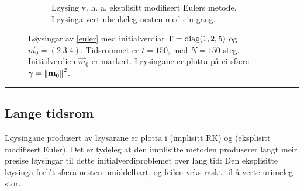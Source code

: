 \documentclass[12pt]{article}
\begin{document}
\begin{minipage}[!b]{\textwidth}
\begin{figure}[H]
\begin{subfigure}{.4\textwidth}
        \caption{
            Løysing v. h. a. eksplisitt modifisert Eulers metode.
            Løysinga vert ubrukeleg nesten med ein gang.
        }
        \label{fig:euler}
        \end{subfigure}
        \caption {
            Løysingar av \eqref{euler} med initialverdiar
            $\mathbf{\mathrm{T}} = \mathrm{diag} (1, 2, 5)$ og $\vec m_0 = (2 \; 3 \; 4)$.
            Tidsrommet er $t = 150$, med $N = 150$ steg.
            Initialverdien $\vec m_0$ er markert.
            Løysingane er plotta på ei sfære $\gamma = \left\lVert{\mathbf{m}}_0\right\rVert_{}^2$.
        }
        \label{fig:loysingar}
    \end{figure}
    \hrule
\end{minipage}
\begin{multicols*}{2}

    \subsection{Lange tidsrom}

    \noindent Løysingane produsert av løysarane er plotta i
     (implisitt RK) og  (eksplisitt modifisert Euler).
    Det er tydeleg at den implisitte metoden produserer
    langt meir presise løysingar til dette initialverdiproblemet
    over lang tid:
    Den eksplisitte løysinga forl\'et sfæra nesten umiddelbart,
    og feilen veks raskt til å verte urimeleg stor.



\printbibliography

\end{multicols*}

\newpage
{}
\fancyhfoffset[O]{0pt}
\end{document}
